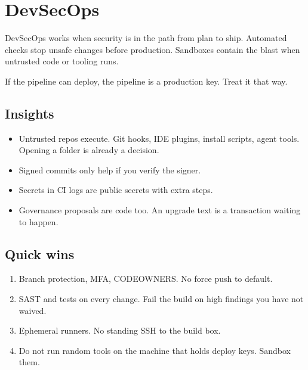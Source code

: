 \chapter{DevSecOps}

DevSecOps works when security is in the path from plan
to ship. Automated checks stop unsafe changes before
production. Sandboxes contain the blast when untrusted
code or tooling runs.

If the pipeline can deploy, the pipeline is a production
key. Treat it that way.

\section{Insights}

\begin{itemize}
  \item Untrusted repos execute. Git hooks, IDE plugins,
  install scripts, agent tools. Opening a folder is
  already a decision.
  \item Signed commits only help if you verify the
  signer.
  \item Secrets in CI logs are public secrets with extra
  steps.
  \item Governance proposals are code too. An upgrade
  text is a transaction waiting to happen.
\end{itemize}

\section{Quick wins}

\begin{enumerate}
  \item Branch protection, MFA, CODEOWNERS. No force
  push to default.
  \item SAST and tests on every change. Fail the build
  on high findings you have not waived.
  \item Ephemeral runners. No standing SSH to the build
  box.
  \item Do not run random tools on the machine that
  holds deploy keys. Sandbox them.
\end{enumerate}
